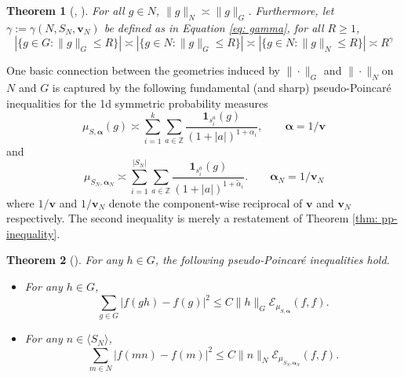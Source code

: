 \documentclass[pdflatex,sn-mathphys-num]{sn-jnl}%
\theoremstyle{thmstyleone}%
\newtheorem{theo}{Theorem}%
\theoremstyle{thmstyletwo}%
\theoremstyle{thmstylethree}%
\begin{document}
\begin{theo}[{\cite[Theorem 3.2.1]{CKSCWZ}}, {\cite[Th. 3.2 and Rm. 3.3]{SCZ-nil}}]
\label{thm: gamma_G}
 For all $g\in N$, $\|g\|_N\asymp \|g\|_G$. Furthermore, let $\gamma := \gamma(N, S_N, \mathbf{v}_N )$ be defined as in Equation  \ref{eq: gamma}, for all $R \ge 1$, 
    $$\left|\{g \in G: \|g\|_G\le R\}\right| \asymp \left|   \{g \in N: \|g\|_G\le R\}\right|\asymp \left|  \{g \in N: \|g\|_N\le R\}\right| \asymp R^{\gamma}$$
\end{theo}



One basic connection between the geometries induced by $\|\cdot\|_G$ and $\|\cdot\|_N$on $N$ and $G$ is captured by the following fundamental (and sharp) pseudo-Poincar\'e inequalities for the 1d  symmetric probability measures 
$$\mu_{S,\bm{\alpha}}(g) \asymp \sum_{i=1}^k \sum_{a\in \mathbb{Z}} \frac{\mathbf{1}_{ s_i^a}(g)}{(1+|a|)^{1+\alpha_i}}, \qquad \bm{\alpha} = 1/\mathbf{v}$$  
and 
\begin{equation}\label{muSigma}
\mu_{S_N, \bm{\alpha}_N} \asymp \sum_{i=1}^{|S_N|} \sum_{a\in \mathbb{Z}} \frac{\mathbf{1}_{ s_i^a}(g)}{(1+|a|)^{1+\tilde{\alpha}_i}}. \qquad \bm{\alpha}_N = 1/\mathbf{v}_N
\end{equation}
where $1/\mathbf{v}$ and 
$ 1/\mathbf{v}_N$ denote the component-wise reciprocal of $\mathbf{v}$ and  $\mathbf{v}_N$ respectively.  
The second inequality is merely a restatement of Theorem \ref{thm: pp-inequality}. 

\begin{theo}[\cite{SCZ-nil,CKSCWZ1}] 
For any $h \in G$, the following pseudo-Poincar\'e inequalities hold.\begin{itemize}
\item For any $h\in G$,   $$  \sum_{g\in G}|f(gh)-f(g)|^2\le C \|h\|_G \mathcal E_{\mu_{S,\bm{\alpha}}}(f,f).$$
\item For any $n \in \langle S_N\rangle$, 
$$  \sum_{m\in N}|f(mn)-f(m)|^2\le C \|n\|_N \mathcal E_{\mu_{S_N,\bm{\alpha}_N}}(f,f).$$
\end{itemize}
\end{theo} 
\end{document}
